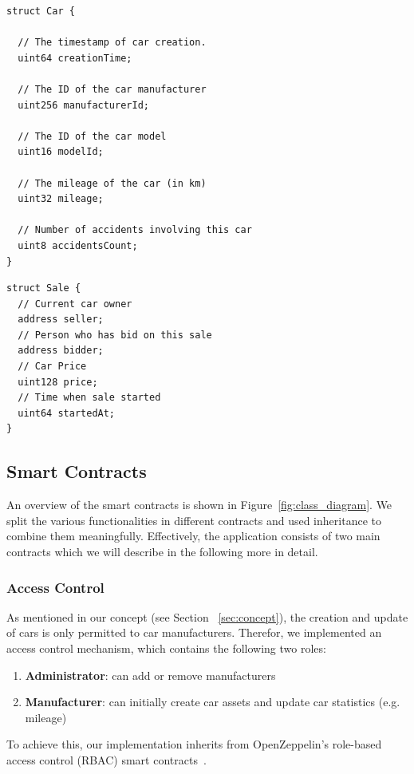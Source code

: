 \begin{minipage}[t]{0.45\linewidth}
\begin{lstlisting}[caption={Car struct}, language=Solidity, label=lst:car_struct, numbers=none]
struct Car {

  // The timestamp of car creation.
  uint64 creationTime;

  // The ID of the car manufacturer
  uint256 manufacturerId;

  // The ID of the car model
  uint16 modelId;

  // The mileage of the car (in km)
  uint32 mileage;

  // Number of accidents involving this car
  uint8 accidentsCount;
}
\end{lstlisting}
\end{minipage}
\hspace{10mm}
\begin{minipage}[t]{0.45\linewidth}
\begin{lstlisting}[caption={Sale struct}, language=Solidity, label=lst:sale_struct, numbers=none]
struct Sale {
  // Current car owner
  address seller;
  // Person who has bid on this sale
  address bidder;
  // Car Price
  uint128 price;
  // Time when sale started
  uint64 startedAt;
}
\end{lstlisting}
\end{minipage}

\clearpage

\subsection{Smart Contracts}
An overview of the smart contracts is shown in Figure~\ref{fig:class_diagram}.
We split the various functionalities in different contracts and used inheritance to combine them meaningfully. Effectively, the application consists of two main contracts which we will describe in the following more in detail.

\subsubsection{Access Control}
As mentioned in our concept (see Section ~\ref{sec:concept}), the creation and update of cars is only permitted to car manufacturers. Therefor, we implemented an access control mechanism, which contains the following two roles:
  \begin{enumerate}
    \item \textbf{Administrator}: can add or remove manufacturers
    \item \textbf{Manufacturer}: can initially create car assets and update car statistics (e.g. mileage)
  \end{enumerate}
To achieve this, our implementation inherits from OpenZeppelin's role-based access control (RBAC) smart contracts~\cite{OpenZeppelinGithub}.

